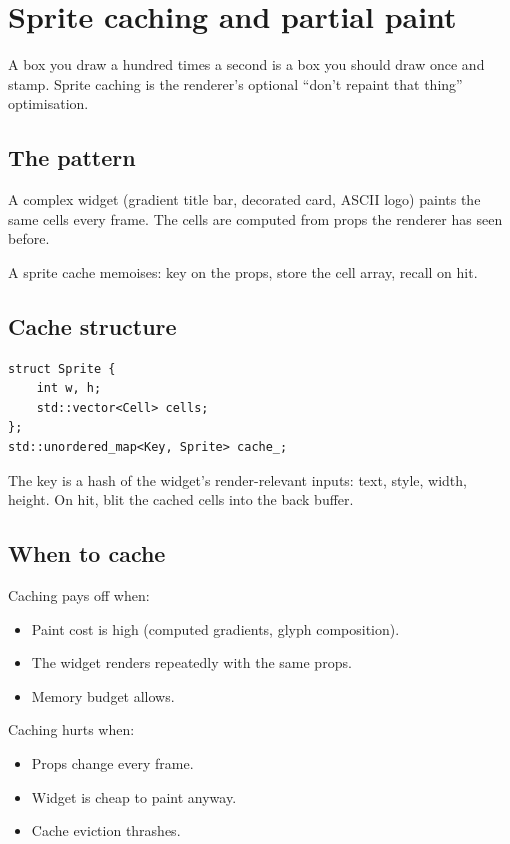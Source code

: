 \chapter{Sprite caching and partial paint}
\label{ch:sprite}

\begin{aside}
A box you draw a hundred times a second is a box you should
draw once and stamp. Sprite caching is the renderer's optional
``don't repaint that thing'' optimisation.
\end{aside}

\section{The pattern}

A complex widget (gradient title bar, decorated card, ASCII
logo) paints the same cells every frame. The cells are computed
from props the renderer has seen before.

A sprite cache memoises: key on the props, store the cell
array, recall on hit.

\section{Cache structure}

\begin{lstlisting}
struct Sprite {
    int w, h;
    std::vector<Cell> cells;
};
std::unordered_map<Key, Sprite> cache_;
\end{lstlisting}

The key is a hash of the widget's render-relevant inputs:
text, style, width, height. On hit, blit the cached cells
into the back buffer.

\section{When to cache}

Caching pays off when:

\begin{itemize}[leftmargin=*]
  \item Paint cost is high (computed gradients, glyph
    composition).
  \item The widget renders repeatedly with the same props.
  \item Memory budget allows.
\end{itemize}

Caching hurts when:

\begin{itemize}[leftmargin=*]
  \item Props change every frame.
  \item Widget is cheap to paint anyway.
  \item Cache eviction thrashes.
\end{itemize}

